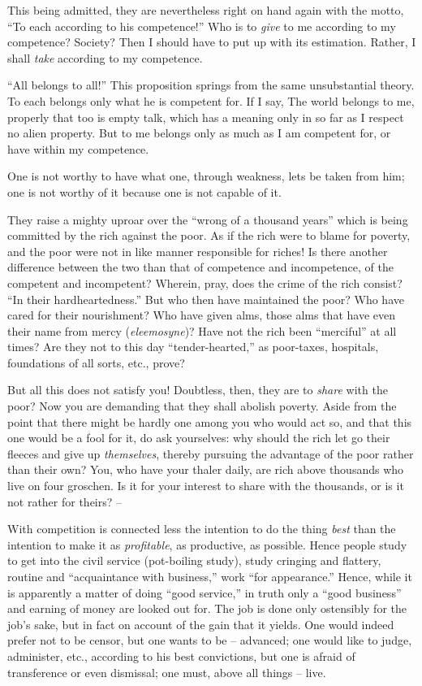 This being admitted, they are nevertheless right on hand again with the motto, 
``To each according to his competence!'' Who is to \textit{give} to me 
according to my competence? Society? Then I should have to put up with its 
estimation. Rather, I shall \textit{take} according to my competence.

``All belongs to all!'' This proposition springs from the same unsubstantial 
theory. To each belongs only what he is competent for. If I say, The world 
belongs to me, properly that too is empty talk, which has a meaning only in so 
far as I respect no alien property. But to me belongs only as much as I am 
competent for, or have within my competence.

One is not worthy to have what one, through weakness, lets be taken from him; 
one is not worthy of it because one is not capable of it.

They raise a mighty uproar over the ``wrong of a thousand years'' which is 
being committed by the rich against the poor. As if the rich were to blame for 
poverty, and the poor were not in like manner responsible for riches! Is there 
another difference between the two than that of competence and incompetence, 
of the competent and incompetent? Wherein, pray, does the crime of the rich 
consist? ``In their hardheartedness.'' But who then have maintained the 
poor? Who have cared for their nourishment? Who have given alms, those alms 
that have even their name from mercy (\textit{eleemosyne})? Have not the rich 
been ``merciful'' at all times? Are they not to this day 
``tender-hearted,'' as poor-taxes, hospitals, foundations of all sorts, 
etc., prove?

But all this does not satisfy you! Doubtless, then, they are to \textit{share} 
with the poor? Now you are demanding that they shall abolish poverty. Aside 
from the point that there might be hardly one among you who would act so, and 
that this one would be a fool for it, do ask yourselves: why should the rich 
let go their fleeces and give up \textit{themselves}, thereby pursuing the 
advantage of the poor rather than their own? You, who have your thaler daily, 
are rich above thousands who live on four groschen. Is it for your interest to 
share with the thousands, or is it not rather for theirs? --

With competition is connected less the intention to do the thing \textit{best} 
than the intention to make it as \textit{profitable}, as productive, as 
possible. Hence people study to get into the civil service (pot-boiling 
study), study cringing and flattery, routine and ``acquaintance with 
business,'' work ``for appearance.'' Hence, while it is apparently a matter 
of doing ``good service,'' in truth only a ``good business'' and earning 
of money are looked out for. The job is done only ostensibly for the job's 
sake, but in fact on account of the gain that it yields. One would indeed 
prefer not to be censor, but one wants to be -- advanced; one would like to 
judge, administer, etc., according to his best convictions, but one is afraid 
of transference or even dismissal; one must, above all things -- live.

